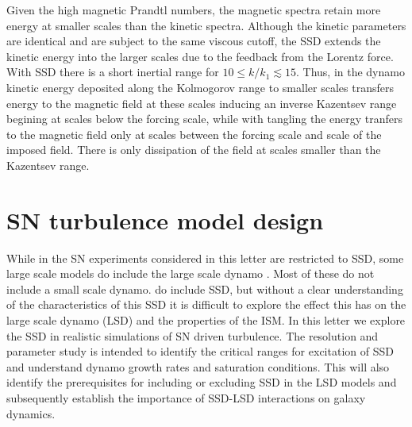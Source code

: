 \documentclass[preprint2]{aastex63}
\begin{document}
Given the high magnetic Prandtl numbers, the magnetic spectra retain more energy
at smaller scales than the kinetic spectra.
Although the kinetic parameters are identical and are subject to the same 
viscous cutoff, the SSD extends the kinetic energy into the larger scales
due to the feedback from the Lorentz force.
With SSD there is a short inertial range for $10\leq k/k_1\lesssim 15$.
Thus, in the dynamo kinetic energy deposited along the Kolmogorov range to
smaller scales transfers energy to the magnetic field at these scales
inducing an inverse Kazentsev range begining at scales below the forcing
scale, while with tangling the energy tranfers to the magnetic field
only at scales between the forcing scale and scale of the imposed field.
There is only dissipation of the field at scales smaller than the Kazentsev 
range.


\section{SN turbulence model design} \label{sec:model}

While in the SN experiments considered in this letter are restricted to
SSD, some large scale models do include the large scale dynamo
\citep[e.g.,][]{Gressel:2008,HWK09,WA09,Gent:2013b,EGSFB16,Pakmor17,GE20}.
Most of these do not include a small scale dynamo.
\citet{Gent:2013b,EGSFB16} do include SSD, but without a clear understanding of
the characteristics of this SSD it is difficult to explore the effect this has
on the large scale dynamo (LSD) and the properties of the ISM.
In this letter we explore the SSD in realistic simulations of SN driven 
turbulence.
The resolution and parameter study is intended to identify the critical ranges
for excitation of SSD and understand dynamo growth rates and saturation 
conditions.
This will also identify the prerequisites for including or excluding SSD in the
LSD models and subsequently establish the importance of SSD-LSD interactions 
on galaxy dynamics. 
\end{document}
